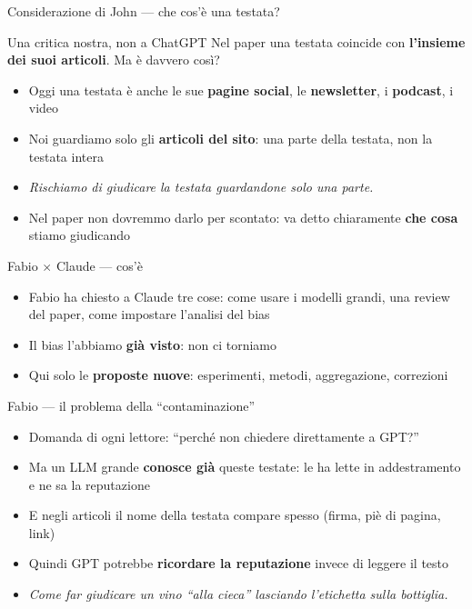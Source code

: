 \documentclass[aspectratio=169]{beamer}
\newcommand{\hl}[1]{\textbf{#1}}
\begin{document}
\begin{frame}{Considerazione di John --- che cos'\`e una testata?}
  \begin{alertblock}{Una critica nostra, non a ChatGPT}
    Nel paper una testata coincide con \hl{l'insieme dei suoi articoli}. Ma \`e davvero cos\`i?
  \end{alertblock}
  \vspace{0.6em}
  \begin{itemize}[<+->]
    \setlength\itemsep{0.8em}
    \item Oggi una testata \`e anche le sue \hl{pagine social}, le \hl{newsletter}, i \hl{podcast}, i video
    \item Noi guardiamo solo gli \hl{articoli del sito}: una parte della testata, non la testata intera
    \item[] {\small\itshape Rischiamo di giudicare la testata guardandone solo una parte.}
    \item Nel paper non dovremmo darlo per scontato: va detto chiaramente \hl{che cosa} stiamo giudicando
  \end{itemize}
\end{frame}

\begin{frame}{Fabio $\times$ Claude --- cos'\`e}
  \vfill
  \begin{itemize}[<+->]
    \setlength\itemsep{0.9em}
    \item Fabio ha chiesto a Claude tre cose: come usare i modelli grandi, una review del paper, come impostare l'analisi del bias
    \item Il bias l'abbiamo \hl{gi\`a visto}: non ci torniamo
    \item Qui solo le \hl{proposte nuove}: esperimenti, metodi, aggregazione, correzioni
  \end{itemize}
  \vfill
\end{frame}

\begin{frame}{Fabio --- il problema della ``contaminazione''}
  \vfill
  \begin{itemize}[<+->]
    \setlength\itemsep{0.8em}
    \item Domanda di ogni lettore: ``perch\'e non chiedere direttamente a GPT?''
    \item Ma un LLM grande \hl{conosce gi\`a} queste testate: le ha lette in addestramento e ne sa la reputazione
    \item E negli articoli il nome della testata compare spesso (firma, pi\`e di pagina, link)
    \item Quindi GPT potrebbe \hl{ricordare la reputazione} invece di leggere il testo
    \item[] {\small\itshape Come far giudicare un vino ``alla cieca'' lasciando l'etichetta sulla bottiglia.}
  \end{itemize}
  \vfill
\end{frame}
\end{document}
